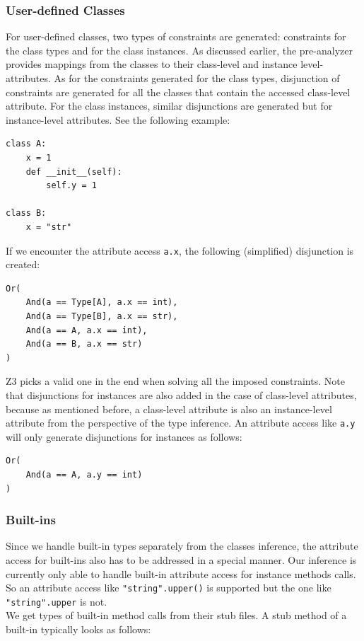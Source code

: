 \subsubsection{User-defined Classes}
For user-defined classes, two types of constraints are generated: constraints for the class types and for the class instances. As discussed earlier, the pre-analyzer provides mappings from the classes to their class-level and instance level-attributes.
As for the constraints generated for the class types, disjunction of constraints are generated for all the classes that contain the accessed class-level attribute. For the class instances, similar disjunctions are generated but for instance-level attributes. See the following example:
\begin{lstlisting}
class A:
	x = 1
	def __init__(self):
		self.y = 1

class B:
	x = "str"
\end{lstlisting}

If we encounter the attribute access \lstinline|a.x|, the following (simplified) disjunction is created:
\begin{lstlisting}
Or(
	And(a == Type[A], a.x == int),
	And(a == Type[B], a.x == str),
	And(a == A, a.x == int),
	And(a == B, a.x == str)
)
\end{lstlisting}
Z3 picks a valid one in the end when solving all the imposed constraints. Note that disjunctions for instances are also added in the case of class-level attributes, because as mentioned before, a class-level attribute is also an instance-level attribute from the perspective of the type inference. An attribute access like \lstinline|a.y| will only generate disjunctions for instances as follows:
\begin{lstlisting}
Or(
	And(a == A, a.y == int)
)
\end{lstlisting}
\subsubsection{Built-ins}
Since we handle built-in types separately from the classes inference, the attribute access for built-ins also has to be addressed in a special manner. Our inference is currently only able to handle built-in attribute access for instance methods calls. So an attribute access like \lstinline|"string".upper()| is supported but the one like \lstinline|"string".upper| is not. \\

We get types of built-in method calls from their stub files. A stub method of a built-in typically looks as follows:

